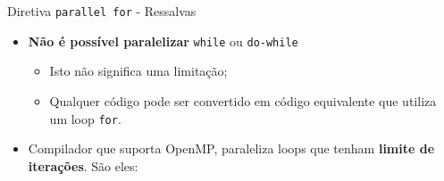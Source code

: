 \begin{frame}[fragile]{Diretiva {\tt parallel for} - Ressalvas}
	\begin{itemize}
		\item {\bf Não é possível paralelizar} {\tt while} ou {\tt do-while}

			\pause

		\begin{itemize}
			\item Isto não significa uma limitação;
			\item Qualquer código pode ser convertido em código equivalente que utiliza um loop {\tt for}.
		\end{itemize}

			\bigskip
			\pause

		\item Compilador que suporta OpenMP, paraleliza loops que tenham {\bf limite de iterações}. São eles:
	\end{itemize}
\end{frame}




